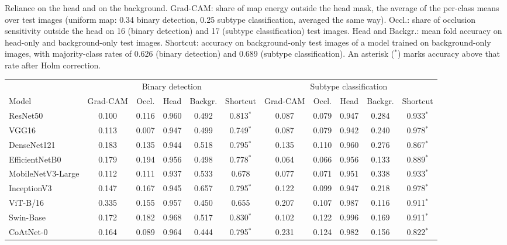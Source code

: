 \documentclass[a4paper,fleqn]{cas-sc}
\begin{document}
\begin{heretable}
\centering
\caption{Reliance on the head and on the background. Grad-CAM: share of map energy outside the head mask, the average of the per-class means over test images (uniform map: 0.34 binary detection, 0.25 subtype classification, averaged the same way). Occl.: share of occlusion sensitivity outside the head on 16 (binary detection) and 17 (subtype classification) test images. Head and Backgr.: mean fold accuracy on head-only and background-only test images. Shortcut: accuracy on background-only test images of a model trained on background-only images, with majority-class rates of 0.626 (binary detection) and 0.689 (subtype classification). An asterisk ($^{*}$) marks accuracy above that rate after Holm correction.}
\label{tab:attention}
\small
\setlength{\tabcolsep}{3pt}
\begin{tabular*}{\textwidth}{@{\extracolsep{\fill}}lcccccccccc@{}}
\toprule
 & \multicolumn{5}{c}{Binary detection} & \multicolumn{5}{c}{Subtype classification} \\
\cmidrule(lr){2-6}\cmidrule(l){7-11}
Model & Grad-CAM & Occl. & Head & Backgr. & Shortcut & Grad-CAM & Occl. & Head & Backgr. & Shortcut \\
\midrule
ResNet50 & 0.100 & 0.116 & 0.960 & 0.492 & 0.813$^{*}$ & 0.087 & 0.079 & 0.947 & 0.284 & 0.933$^{*}$ \\
VGG16 & 0.113 & 0.007 & 0.947 & 0.499 & 0.749$^{*}$ & 0.087 & 0.079 & 0.942 & 0.240 & 0.978$^{*}$ \\
DenseNet121 & 0.183 & 0.135 & 0.944 & 0.518 & 0.795$^{*}$ & 0.135 & 0.110 & 0.960 & 0.276 & 0.867$^{*}$ \\
EfficientNetB0 & 0.179 & 0.194 & 0.956 & 0.498 & 0.778$^{*}$ & 0.064 & 0.066 & 0.956 & 0.133 & 0.889$^{*}$ \\
MobileNetV3-Large & 0.112 & 0.111 & 0.937 & 0.533 & 0.678 & 0.077 & 0.071 & 0.951 & 0.338 & 0.933$^{*}$ \\
InceptionV3 & 0.147 & 0.167 & 0.945 & 0.657 & 0.795$^{*}$ & 0.122 & 0.099 & 0.947 & 0.218 & 0.978$^{*}$ \\
ViT-B/16 & 0.335 & 0.155 & 0.957 & 0.450 & 0.655 & 0.207 & 0.107 & 0.987 & 0.116 & 0.911$^{*}$ \\
Swin-Base & 0.172 & 0.182 & 0.968 & 0.517 & 0.830$^{*}$ & 0.102 & 0.122 & 0.996 & 0.169 & 0.911$^{*}$ \\
CoAtNet-0 & 0.164 & 0.089 & 0.964 & 0.444 & 0.795$^{*}$ & 0.231 & 0.124 & 0.982 & 0.156 & 0.822$^{*}$ \\
\bottomrule
\end{tabular*}
\end{heretable}
\end{document}
